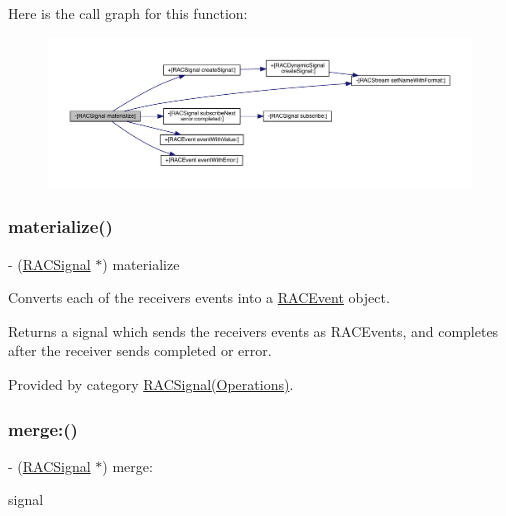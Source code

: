 Here is the call graph for this function\+:\nopagebreak
\begin{figure}[H]
\begin{center}
\leavevmode
\includegraphics[width=350pt]{interface_r_a_c_signal_a2b970ec1845b139478ba31f00fe34b71_cgraph}
\end{center}
\end{figure}
\mbox{\label{interface_r_a_c_signal_a2b970ec1845b139478ba31f00fe34b71}} 
\subsubsection{\texorpdfstring{materialize()}{materialize()}\hspace{0.1cm}{\footnotesize\ttfamily [3/3]}}
{\footnotesize\ttfamily -\/ (\mbox{\hyperlink{interface_r_a_c_signal}{R\+A\+C\+Signal}} $\ast$) materialize \begin{DoxyParamCaption}{ }\end{DoxyParamCaption}}

Converts each of the receiver\textquotesingle{}s events into a \mbox{\hyperlink{interface_r_a_c_event}{R\+A\+C\+Event}} object.

Returns a signal which sends the receiver\textquotesingle{}s events as R\+A\+C\+Events, and completes after the receiver sends {\ttfamily completed} or {\ttfamily error}. 

Provided by category \mbox{\hyperlink{category_r_a_c_signal_07_operations_08_a2b970ec1845b139478ba31f00fe34b71}{R\+A\+C\+Signal(\+Operations)}}.

\mbox{\label{interface_r_a_c_signal_aeda66daaf146a2d218ba7819297628a9}} 
\subsubsection{\texorpdfstring{merge\+:()}{merge:()}\hspace{0.1cm}{\footnotesize\ttfamily [1/6]}}
{\footnotesize\ttfamily -\/ (\mbox{\hyperlink{interface_r_a_c_signal}{R\+A\+C\+Signal}} $\ast$) merge\+: \begin{DoxyParamCaption}\item[{(\mbox{\hyperlink{interface_r_a_c_signal}{R\+A\+C\+Signal}} $\ast$)}]{signal }\end{DoxyParamCaption}}

